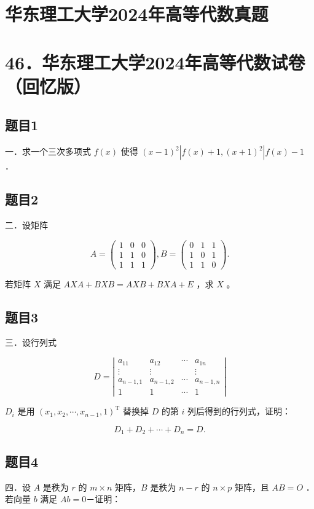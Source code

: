 \documentclass{article}
\begin{document}
\section*{华东理工大学2024年高等代数真题}
\section*{46．华东理工大学2024年高等代数试卷（回忆版）}

\subsection{题目1}
一．求一个三次多项式 \(f(x)\) 使得 \((x-1)^{2}\left|f(x)+1,(x+1)^{2}\right| f(x)-1\) ．

\subsection{题目2}
二．设矩阵

\[
A=\left(\begin{array}{lll}
1 & 0 & 0 \\
1 & 1 & 0 \\
1 & 1 & 1
\end{array}\right), B=\left(\begin{array}{lll}
0 & 1 & 1 \\
1 & 0 & 1 \\
1 & 1 & 0
\end{array}\right) .
\]

若矩阵 \(X\) 满足 \(A X A+B X B=A X B+B X A+E\) ，求 \(X\) 。

\subsection{题目3}
三．设行列式

\[
D=\left|\begin{array}{cccc}
a_{11} & a_{12} & \cdots & a_{1 n} \\
\vdots & \vdots & & \vdots \\
a_{n-1,1} & a_{n-1,2} & \cdots & a_{n-1, n} \\
1 & 1 & \cdots & 1
\end{array}\right|
\]

\(D_{i}\) 是用 \(\left(x_{1}, x_{2}, \cdots, x_{n-1}, 1\right)^{\mathrm{T}}\) 替换掉 \(D\) 的第 \(i\) 列后得到的行列式，证明：

\[
D_{1}+D_{2}+\cdots+D_{n}=D .
\]

\subsection{题目4}
四．设 \(A\) 是秩为 \(r\) 的 \(m \times n\) 矩阵，\(B\) 是秩为 \(n-r\) 的 \(n \times p\) 矩阵，且 \(A B=O\) ．若向量 \(b\) 满足 \(A b=0\)－证明：
\end{document}
